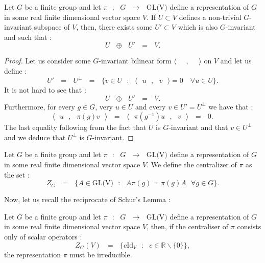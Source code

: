 \documentclass[envcountsame,envcountchap]{svmono}
\newcommand{\R}{\mathbb R}
\newcommand{\sub}{\subset}
\newcommand{\prods}[2]{\langle\qq #1\qq,\qq#2\qq\rangle}
\newcommand{\q}{\quad}
\newcommand{\qq}{\text{ }}
\newcommand{\fctt}[2]{\qq:\qq#1\qq\rightarrow\qq#2}
\begin{document}
\begin{theorem}
	Let $G$ be a finite group and let $\pi \fctt{G}{\mbox{GL(V)}}$ define a representation of $G$ in some real finite dimensional vector space $V$. If $U\sub V$ defines a non-trivial $G$-invariant subspace of $V$, then, there exists some $U'\sub V$ which is also $G$-invariant and such that :
	\begin{equation}
	U\qq \oplus \qq U'\qq=\qq V.
	\end{equation}
\end{theorem}
\begin{proof}
	Let us consider some $G$-invariant bilinear form $\prods{}{}$ on $V$ and let us define :
	\begin{equation}
	U'\qq=\qq U^\perp\qq=\qq\{v\in U\qq :\qq \prods{u}{v}=0\q \forall u\in U\}.
	\end{equation}
	It is not hard to see that :
	\begin{equation}
	U\qq \oplus \qq U'\qq=\qq V.
	\end{equation}
	Furthermore, for every $g\in G$, very $u\in U$ and every $v\in U'=U^\perp$ we have that :
	\begin{equation}
	\prods{u}{\pi(g)v}\qq=\qq \prods{\pi(g^{-1})u}{v}\qq=\qq 0.
	\end{equation}
	The last equality following from the fact that $U$ is $G$-invariant and that $v\in U^\perp$ and we deduce that $U^\perp$ is $G$-invariant.
\end{proof}
\begin{definition}
	Let $G$ be a finite group and let $\pi \fctt{G}{\mbox{GL(V)}}$ define a representation of $G$ in some real finite dimensional vector space $V$. We define the centralizer of $\pi$ as the set :
	\begin{equation}
	Z_G\qq=\qq \{A\in \mbox{GL(V)}\qq :\qq A\pi(g)=\pi(g)A\qq\forall g\in G\}.
	\end{equation}
\end{definition}
Now, let us recall the reciprocate of Schur's Lemma :
\begin{lemma}\label{si le centralisateur n'est fait que d'application scalaire, alors V est irreductible}
	Let $G$ be a finite group and let $\pi \fctt{G}{\mbox{GL(V)}}$ define a representation of $G$ in some real finite dimensional vector space $V$, then, if the centraliser of $\pi$ consists only of scalar operators :
	\begin{equation}
	Z_G(V)\qq=\qq \{c\mbox{Id}_V\qq :\qq c\in \R\backslash\{0\}\},
	\end{equation}
	the representation $\pi$ must be irreducible.
\end{lemma}
\end{document}

